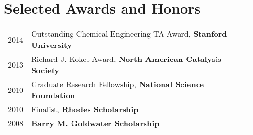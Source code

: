 \documentclass[a4paper,10pt]{article}
\begin{document}
\section{Selected Awards and Honors}
\begin{tabular}{ll}
2014 & Outstanding Chemical Engineering TA Award, \textbf{Stanford University} \\
2013 & Richard J. Kokes Award, \textbf{North American Catalysis Society} \\
2010 & Graduate Research Fellowship, \textbf{National Science Foundation} \\
2010 & Finalist, \textbf{Rhodes Scholarship} \\
2008 & \textbf{Barry M. Goldwater Scholarship} \\
\end{tabular}

\begin{refsection}
\nocite{Dagdelen2017,Mathew2017,C7CP02855E,Montoya2017a,Montoya2017,Latimer2016,Seitz2016,Sandberg2016,Tsai2016,Wang2015,Bertheussen2016,Doyle2015,Montoya2015,Montoya2015a,Schaal2007,Montoya2014,Hansen2013,Montoya2013}
%
\printbibliography
\end{refsection}
\vspace{0.2in}
\begin{refsection}
\nocite{Montoya2017c,Montoya2017b,Singh2017,Singh2017a}
\printbibliography[title=Forthcoming Publications]
\end{refsection}
\vspace{0.2in}
\end{document}
